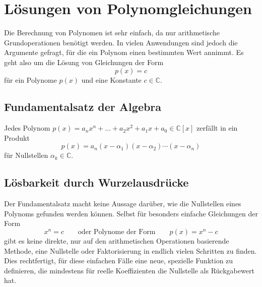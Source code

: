 %
%
%
\section{Lösungen von Polynomgleichungen
\label{buch:potenzen:section:loesungen}}
Die Berechnung von Polynomen ist sehr einfach, da nur arithmetische 
Grundoperationen benötigt werden.
In vielen Anwendungen sind jedoch die Argumente gefragt, für die ein
Polynom einen bestimmten Wert annimmt.
Es geht also um die Lösung von Gleichungen der Form
\[
p(x) = c
\]
für ein Polynome $p(x)$ und eine Konstante $c\in\mathbb{C}$.

%
%
\subsection{Fundamentalsatz der Algebra}

\begin{satz}[Gauss]
Jedes Polynom $p(x)=a_nx^n+\dots + a_2x^2 + a_1x + a_0\in\mathbb{C}[x]$
zerfällt in ein Produkt
\[
p(x)
=
a_n
(x-\alpha_1)(x-\alpha_2)\cdots(x-\alpha_n)
\]
für Nullstellen $\alpha_k\in\mathbb{C}$.
\end{satz}

%
%
\subsection{Lösbarkeit durch Wurzelausdrücke}
Der Fundamentalsatz macht keine Aussage darüber, wie die Nullstellen
eines Polynoms gefunden werden können.
Selbst für besonders einfache Gleichungen der Form
\[
x^n = c
\qquad
\text{oder Polynome der Form}
\qquad
p(x) = x^n -c
\]
gibt es keine direkte, nur auf den arithmetischen
Operationen basierende Methode, eine Nullstelle oder Faktorisierung
in endlich vielen Schritten zu finden.
Dies rechtfertigt, für diese einfachen Fälle eine neue, spezielle
Funktion zu definieren, die mindestens für reelle Koeffizienten 
die Nullstelle als Rückgabewert hat.

